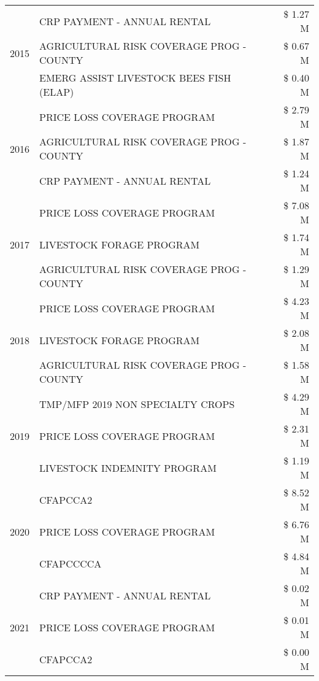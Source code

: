 \begin{tabular}{llr}
\cline{1-3}
\multirow[t]{3}{*}{2015} & CRP PAYMENT - ANNUAL RENTAL & \$ 1.27 M \\
 & AGRICULTURAL RISK COVERAGE PROG - COUNTY & \$ 0.67 M \\
 & EMERG ASSIST LIVESTOCK BEES FISH (ELAP) & \$ 0.40 M \\
\cline{1-3}
\multirow[t]{3}{*}{2016} & PRICE LOSS COVERAGE PROGRAM & \$ 2.79 M \\
 & AGRICULTURAL RISK COVERAGE PROG - COUNTY & \$ 1.87 M \\
 & CRP PAYMENT - ANNUAL RENTAL & \$ 1.24 M \\
\cline{1-3}
\multirow[t]{3}{*}{2017} & PRICE LOSS COVERAGE PROGRAM & \$ 7.08 M \\
 & LIVESTOCK FORAGE PROGRAM & \$ 1.74 M \\
 & AGRICULTURAL RISK COVERAGE PROG - COUNTY & \$ 1.29 M \\
\cline{1-3}
\multirow[t]{3}{*}{2018} & PRICE LOSS COVERAGE PROGRAM & \$ 4.23 M \\
 & LIVESTOCK FORAGE PROGRAM & \$ 2.08 M \\
 & AGRICULTURAL RISK COVERAGE PROG - COUNTY & \$ 1.58 M \\
\cline{1-3}
\multirow[t]{3}{*}{2019} & TMP/MFP 2019 NON SPECIALTY CROPS & \$ 4.29 M \\
 & PRICE LOSS COVERAGE PROGRAM & \$ 2.31 M \\
 & LIVESTOCK INDEMNITY PROGRAM & \$ 1.19 M \\
\cline{1-3}
\multirow[t]{3}{*}{2020} & CFAPCCA2 & \$ 8.52 M \\
 & PRICE LOSS COVERAGE PROGRAM & \$ 6.76 M \\
 & CFAPCCCCA & \$ 4.84 M \\
\cline{1-3}
\multirow[t]{3}{*}{2021} & CRP PAYMENT - ANNUAL RENTAL & \$ 0.02 M \\
 & PRICE LOSS COVERAGE PROGRAM & \$ 0.01 M \\
 & CFAPCCA2 & \$ 0.00 M \\
\cline{1-3}
\bottomrule
\end{tabular}
